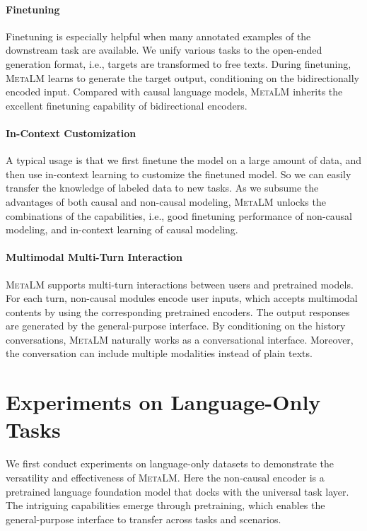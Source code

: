 \documentclass{article}
\theoremstyle{plain}
\theoremstyle{definition}
\theoremstyle{remark}
\newcommand\ours{\textsc{MetaLM}}
\begin{document}
\paragraph{Finetuning}
Finetuning is especially helpful when many annotated examples of the downstream task are available.
We unify various tasks to the open-ended generation format, i.e., targets are transformed to free texts.
During finetuning, \ours{} learns to generate the target output, conditioning on the bidirectionally encoded input.
Compared with causal language models, \ours{} inherits the excellent finetuning capability of bidirectional encoders.


\paragraph{In-Context Customization}
A typical usage is that we first finetune the model on a large amount of data, and then use in-context learning to customize the finetuned model.
So we can easily transfer the knowledge of labeled data to new tasks.
As we subsume the advantages of both causal and non-causal modeling, \ours{} unlocks the combinations of the capabilities, i.e., good finetuning performance of non-causal modeling, and in-context learning of causal modeling.


\paragraph{Multimodal Multi-Turn Interaction}
\ours{} supports multi-turn interactions between users and pretrained models.
For each turn, non-causal modules encode user inputs, which accepts multimodal contents by using the corresponding pretrained encoders.
The output responses are generated by the general-purpose interface.
By conditioning on the history conversations, \ours{} naturally works as a conversational interface.
Moreover, the conversation can include multiple modalities instead of plain texts.


\section{Experiments on Language-Only Tasks}
\label{sec:lang:exp}

We first conduct experiments on language-only datasets to demonstrate the versatility and effectiveness of \ours{}.
Here the non-causal encoder is a pretrained language foundation model that docks with the universal task layer.
The intriguing capabilities emerge through pretraining, which enables the general-purpose interface to transfer across tasks and scenarios.
\end{document}
